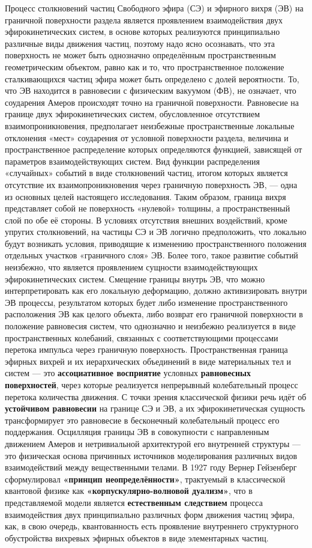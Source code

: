 Процесс столкновений частиц Свободного эфира (СЭ) и эфирного вихря (ЭВ) на граничной поверхности раздела является проявлением взаимодействия двух эфирокинетических систем, в основе которых реализуются принципиально различные виды движения частиц, поэтому надо ясно осознавать, что эта поверхность не может быть однозначно определённым пространственным геометрическим объектом, равно как и то, что пространственное положение сталкивающихся частиц эфира может быть определено с долей вероятности. То, что ЭВ находится в равновесии с физическим вакуумом (ФВ), не означает, что соударения Амеров происходят точно на граничной поверхности. Равновесие на границе двух эфирокинетических систем, обусловленное отсутствием взаимопроникновения, предполагает неизбежные пространственные локальные отклонения «мест» соударения от условной поверхности раздела, величина и пространственное распределение которых определяются функцией, зависящей от параметров взаимодействующих систем. Вид функции распределения «случайных» событий в виде столкновений частиц, итогом которых является отсутствие их взаимопроникновения через граничную поверхность ЭВ, — одна из основных целей настоящего исследования. Таким образом, граница вихря представляет собой не поверхность «нулевой» толщины, а пространственный слой по обе её стороны. В условиях отсутствия внешних воздействий, кроме упругих столкновений, на частицы СЭ и ЭВ логично предположить, что локально будут возникать условия, приводящие к изменению пространственного положения отдельных участков «граничного слоя» ЭВ. Более того, такое развитие событий неизбежно, что является проявлением сущности взаимодействующих эфирокинетических систем. Смещение границы внутрь ЭВ, что можно интерпретировать как его локальную деформацию, должно активизировать внутри ЭВ процессы, результатом которых будет либо изменение пространственного расположения ЭВ как целого объекта, либо возврат его граничной поверхности в положение равновесия систем, что однозначно и неизбежно реализуется в виде пространственных колебаний, связанных с соответствующими процессами перетока импульса через граничную поверхность. Пространственная граница эфирных вихрей и их иерархических объединений в виде материальных тел и систем — это \textbf{ассоциативное восприятие} условных \textbf{равновесных поверхностей}, через которые реализуется непрерывный колебательный процесс перетока количества движения. С точки зрения классической физики речь идёт об \textbf{устойчивом равновесии} на границе СЭ и ЭВ, а их эфирокинетическая сущность трансформирует это равновесие в бесконечный колебательный процесс его поддержания. Осцилляция границы ЭВ в совокупности с направленным движением Амеров и нетривиальной архитектурой его внутренней структуры — это физическая основа причинных источников моделирования различных видов взаимодействий между вещественными телами. В 1927 году Вернер Гейзенберг сформулировал \textbf{«принцип неопределённости»}, трактуемый в классической квантовой физике как \textbf{«корпускулярно-волновой дуализм»}, что в представляемой модели является \textbf{естественным следствием} процесса взаимодействия двух принципиально различных форм движения частиц эфира, как, в свою очередь, квантованность есть проявление внутреннего структурного обустройства вихревых эфирных объектов в виде элементарных частиц.
